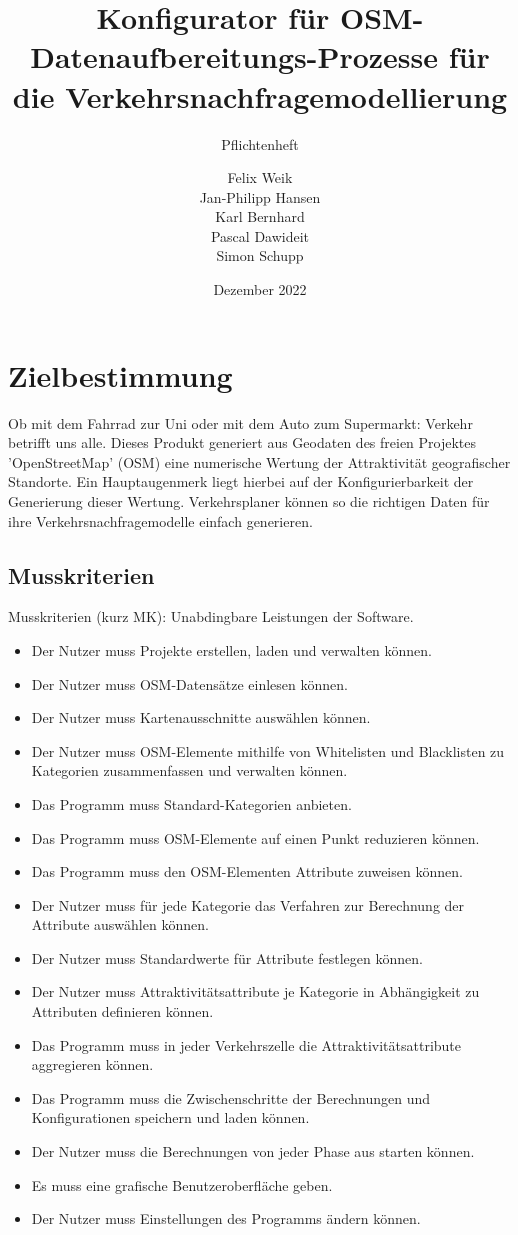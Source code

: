 \documentclass[parskip=full]{scrartcl} %
\title{Konfigurator für OSM-Datenaufbereitungs-Prozesse für die Verkehrsnachfragemodellierung}
\subtitle{Pflichtenheft}
\author{Felix Weik\\ Jan-Philipp Hansen\\ Karl Bernhard\\ Pascal Dawideit\\ Simon Schupp}
\date{Dezember 2022}
\begin{document}
\maketitle
\newpage

\tableofcontents
\newpage


\section{Zielbestimmung}
Ob mit dem Fahrrad zur Uni oder mit dem Auto zum Supermarkt: Verkehr betrifft uns alle. Dieses Produkt generiert aus Geodaten des freien Projektes 'OpenStreetMap' (OSM) eine numerische Wertung der Attraktivität geografischer Standorte. Ein Hauptaugenmerk liegt hierbei auf der Konfigurierbarkeit der Generierung dieser Wertung. Verkehrsplaner können so die richtigen Daten für ihre Verkehrsnachfragemodelle einfach generieren.

\subsection{Musskriterien}
Musskriterien (kurz MK): Unabdingbare Leistungen der Software.

\begin{itemize}
    \item <MK1> Der Nutzer muss Projekte erstellen, laden und verwalten können.
    \item <MK2> Der Nutzer muss OSM-Datensätze einlesen können.
    \item <MK3> Der Nutzer muss Kartenausschnitte auswählen können.
    \item <MK4> Der Nutzer muss OSM-Elemente mithilfe von Whitelisten und Blacklisten zu Kategorien zusammenfassen und verwalten können.
    \item <MK5> Das Programm muss Standard-Kategorien anbieten.
    \item <MK6> Das Programm muss OSM-Elemente auf einen Punkt reduzieren können.
    \item <MK7> Das Programm muss den OSM-Elementen Attribute zuweisen können.
    \item <MK8> Der Nutzer muss für jede Kategorie das Verfahren zur Berechnung der Attribute auswählen können.
    \item <MK9> Der Nutzer muss Standardwerte für Attribute festlegen können.
    \item <MK10> Der Nutzer muss Attraktivitätsattribute je Kategorie in Abhängigkeit zu Attributen definieren können.
    \item <MK11> Das Programm muss in jeder Verkehrszelle die Attraktivitätsattribute aggregieren können.
    \item <MK12> Das Programm muss die Zwischenschritte der Berechnungen und Konfigurationen speichern und laden können.
    \item <MK13> Der Nutzer muss die Berechnungen von jeder Phase aus starten können.
    \item <MK14> Es muss eine grafische Benutzeroberfläche geben.
    \item <MK15> Der Nutzer muss Einstellungen des Programms ändern können.
\end{itemize}
\end{document}

